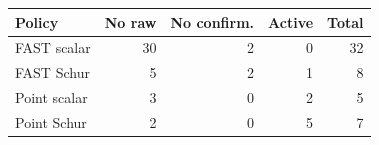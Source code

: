 \begin{tabular}{@{}lrrrr@{}}
\toprule
Policy & No raw & No confirm. & Active & Total\\\midrule
FAST scalar & 30 & 2 & 0 & 32\\
FAST Schur & 5 & 2 & 1 & 8\\
Point scalar & 3 & 0 & 2 & 5\\
Point Schur & 2 & 0 & 5 & 7\\
\bottomrule
\end{tabular}
